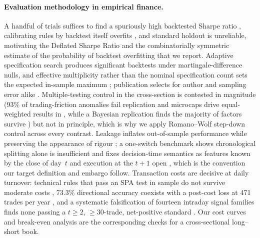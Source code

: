 \paragraph{Evaluation methodology in empirical finance.}
A handful of trials suffices to find a spuriously high backtested Sharpe ratio
\citep{bailey2014pseudo}, calibrating rules by backtest itself overfits
\citep{carr2014determining}, and standard holdout is unreliable, motivating the
Deflated Sharpe Ratio \citep{bailey2014deflated} and the combinatorially
symmetric estimate of the probability of backtest overfitting
\citep{bailey2017probability} that we report. Adaptive specification search
produces significant backtests under martingale-difference nulls, and effective
multiplicity rather than the nominal specification count sets the expected
in-sample maximum \citep{nikolopoulos2026spurious}; publication selects for
author and sampling error alike \citep{chen2022publication}. Multiple-testing
control in the cross-section is contested in magnitude (93\% of
trading-friction anomalies fail replication and microcaps drive equal-weighted
results in \citet{hou2020replicating}, while a Bayesian replication finds the
majority of factors survive \citep{jensen2021there}) but not in principle,
which is why we apply Romano--Wolf step-down control \citep{romano2005stepwise}
across every contrast. Leakage inflates out-of-sample performance while
preserving the appearance of rigour \citep{bhand2026illusion}; a one-switch
benchmark shows chronological splitting alone is insufficient and fixes
decision-time semantics as features known by the close of day~$t$ and execution
at the $t{+}1$ open \citep{zhang2026alpha}, which is the convention our
target definition and embargo follow. Transaction costs are decisive at daily
turnover: technical rules that pass an SPA test in sample do not survive
moderate costs \citep{rink2023predictive}, 73.3\% directional accuracy
coexists with a post-cost loss at 471 trades per year \citep{pall2026transaction},
and a systematic falsification of fourteen intraday signal families finds none
passing a $t\ge 2$, $\ge 30$-trade, net-positive standard
\citep{mesfin2026structural}. Our cost curves and break-even analysis are the
corresponding checks for a cross-sectional long--short book.
